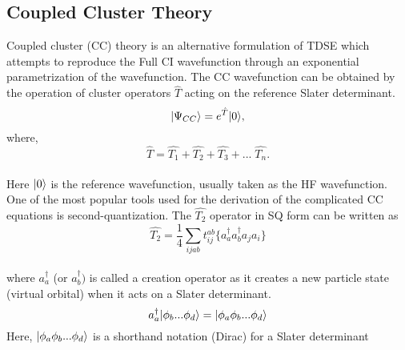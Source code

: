 \subsection{Coupled Cluster Theory} 
Coupled cluster (CC) theory\cite{} is an alternative formulation of TDSE which attempts to 
reproduce the Full CI wavefunction through an exponential parametrization
of the wavefunction. The CC wavefunction can be obtained by the operation of cluster
operators $\hat{T}$ acting on the reference Slater determinant. 
\\
\begin{equation}
| \Psi_{CC} \rangle = e^{\hat{T}}| 0 \rangle , 
\end{equation}
where,
\begin{equation}
 \hat{T} = \hat{T_1} + \hat{T_2} + \hat{T_3} + ... \;\hat {T_n}.
\end{equation}
\\
Here $| 0 \rangle$ is the reference wavefunction, usually taken as the HF
wavefunction. One of the most popular tools used for the derivation of the 
complicated CC equations is second-quantization\cite{JorgensenSimons81}.
The $\hat{T_2}$ operator in SQ form can be written as
\\
\begin{equation}
\hat{T_2} = \frac{1}{4}\sum_{ijab}t^{ab}_{ij}\{a^\dagger_aa^\dagger_ba_ja_i\}
\end{equation}
\\
where ${a}^\dagger_a$ (or ${a}^\dagger_b)$ is called a creation operator as it 
creates a new particle state (virtual orbital) when it acts on a Slater determinant.
\begin{equation}
{a}^\dagger_a| \phi_b...\phi_d \rangle = | \phi_a\phi_b...\phi_d \rangle
\end{equation}
Here, $| \phi_a\phi_b...\phi_d \rangle$ is a shorthand notation (Dirac) for a Slater determinant
